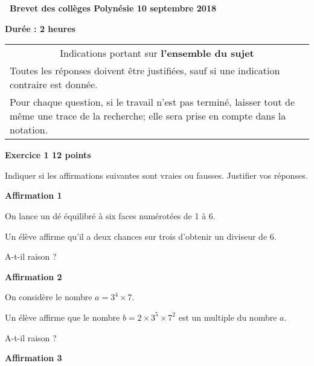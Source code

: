 \documentclass[10pt]{article}
\begin{document}
\setlength\parindent{0mm}
\pagestyle{fancy}
\thispagestyle{empty}
\begin{center}
 
{\Large \textbf{\decofourleft~Brevet des collèges Polynésie 10 septembre 2018~\decofourright}}

\bigskip

\textbf{Durée : 2 heures} \end{center}

\bigskip

\begin{tabularx}{\linewidth}{|X|}\hline
\multicolumn{1}{|c|}{Indications portant sur \textbf{l'ensemble du sujet}}\\
Toutes les réponses doivent être justifiées, sauf si une indication contraire est
donnée.\\
Pour chaque question, si le travail n'est pas terminé, laisser tout de même une
trace de la recherche; elle sera prise en compte dans la notation.\\ \hline
\end{tabularx}

\bigskip

\textbf{Exercice 1 \hfill 12 points}

\medskip

Indiquer si les affirmations suivantes sont vraies ou fausses. Justifier vos réponses.

\medskip

\textbf{Affirmation 1}

\smallskip

On lance un dé équilibré à six faces numérotées de 1 à 6.

Un élève affirme qu'il a deux chances sur trois d'obtenir un diviseur de 6.

A-t-il raison ?

\medskip

\textbf{Affirmation 2}

\smallskip

On considère le nombre $a = 3^4 \times 7$.

Un élève affirme que le nombre $b = 2 \times 3^5 \times 7^2$ est un multiple du nombre $a$.

A-t-il raison ?

\medskip

\textbf{Affirmation 3}

\smallskip
\end{document}
